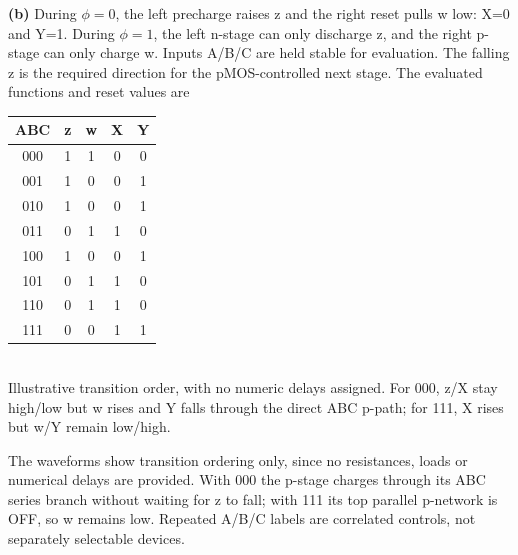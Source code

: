 \documentclass[10pt]{article}
\begin{document}
\textbf{(b)} During $\phi=0$, the left precharge raises z and the right reset pulls w low: X=0 and Y=1. During $\phi=1$, the left n-stage can only discharge z, and the right p-stage can only charge w. Inputs A/B/C are held stable for evaluation. The falling z is the required direction for the pMOS-controlled next stage. The evaluated functions and reset values are
\begin{center}\begin{tabular}{c|cc|cc}\toprule
ABC&z&w&X&Y\\\midrule
000&1&1&0&0\\001&1&0&0&1\\010&1&0&0&1\\011&0&1&1&0\\
100&1&0&0&1\\101&0&1&1&0\\110&0&1&1&0\\111&0&0&1&1\\\bottomrule
\end{tabular}\end{center}
\begin{center}\\Illustrative transition order, with no numeric delays assigned. For 000, z/X stay high/low but w rises and Y falls through the direct ABC p-path; for 111, X rises but w/Y remain low/high.\end{center}
The waveforms show transition ordering only, since no resistances, loads or numerical delays are provided. With 000 the p-stage charges through its ABC series branch without waiting for z to fall; with 111 its top parallel p-network is OFF, so w remains low. Repeated A/B/C labels are correlated controls, not separately selectable devices.
\end{document}
